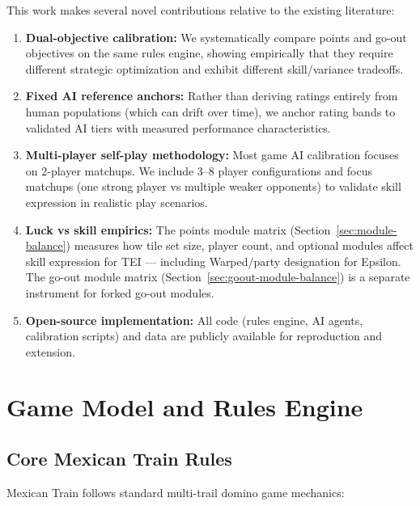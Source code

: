 \documentclass[11pt,letterpaper]{article}
\begin{document}
This work makes several novel contributions relative to the existing literature:

\begin{enumerate}
\item \textbf{Dual-objective calibration:} We systematically compare points and go-out objectives on the same rules engine, showing empirically that they require different strategic optimization and exhibit different skill/variance tradeoffs.

\item \textbf{Fixed AI reference anchors:} Rather than deriving ratings entirely from human populations (which can drift over time), we anchor rating bands to validated AI tiers with measured performance characteristics.

\item \textbf{Multi-player self-play methodology:} Most game AI calibration focuses on 2-player matchups. We include 3--8 player configurations and focus matchups (one strong player vs multiple weaker opponents) to validate skill expression in realistic play scenarios.

\item \textbf{Luck vs skill empirics:} The points module matrix (Section~\ref{sec:module-balance}) measures how tile set size, player count, and optional modules affect skill expression for TEI --- including Warped/party designation for Epsilon. The go-out module matrix (Section~\ref{sec:goout-module-balance}) is a separate instrument for forked go-out modules.

\item \textbf{Open-source implementation:} All code (rules engine, AI agents, calibration scripts) and data are publicly available for reproduction and extension.
\end{enumerate}

\section{Game Model and Rules Engine}

\subsection{Core Mexican Train Rules}

Mexican Train follows standard multi-trail domino game mechanics:
\end{document}
